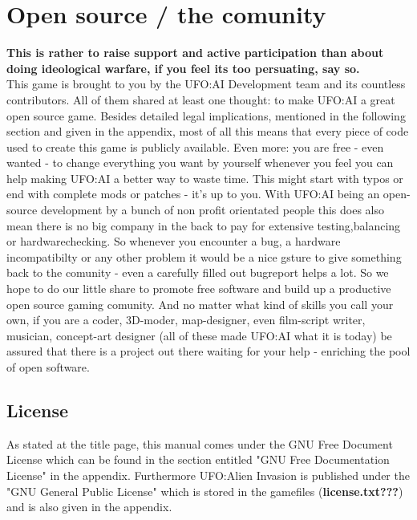 \section{Open source / the comunity}
\textbf{This is rather to raise support and active participation than about doing ideological warfare, if you feel its too persuating, say so.}\\
This game is brought to you by the UFO:AI Development team and its countless contributors. All of them shared at least one thought: to make UFO:AI a great open source game. Besides detailed legal implications, mentioned in the following section and given in the appendix, most of all this means that every piece of code used to create this game is publicly available. Even more: you are free - even wanted - to change everything you want by yourself whenever you feel you can help making UFO:AI a better way to waste time. This might start with typos or end with complete mods or patches - it's up to you.  With UFO:AI being  an open-source development by a bunch of non profit orientated people this does also mean there is no big company in the back to pay for extensive testing,balancing or hardwarechecking. So whenever you encounter a bug, a hardware incompatibilty or any other problem it would be a nice gsture to give something back to the comunity - even a carefully filled out bugreport helps a lot. So we hope to do our little share to promote free software and build up a productive open source gaming comunity. And no matter what kind of skills you call your own, if you are a coder, 3D-moder, map-designer, even film-script writer, musician, concept-art designer (all of these made UFO:AI what it is today) be assured that there is a project out there waiting for your help - enriching the pool of open software.

\subsection{License}
As stated at the title page, this manual comes under the GNU Free Document License which can be found  in the section entitled "GNU Free Documentation License" in the appendix.
Furthermore UFO:Alien Invasion is published under the "GNU General Public License" which is stored in the gamefiles (\textbf{license.txt???}) and is also given in the appendix.

